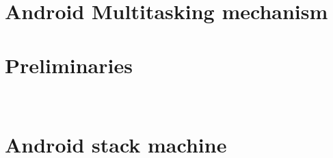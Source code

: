 \documentclass[preprint,12pt]{elsarticle}
\begin{document}

 
\section{Android Multitasking mechanism} \label{sec:amm}





\section{Preliminaries}~\label{sec:prel}



\section{Android stack machine} \label{sec:amass}




% 


% 




\end{document}

